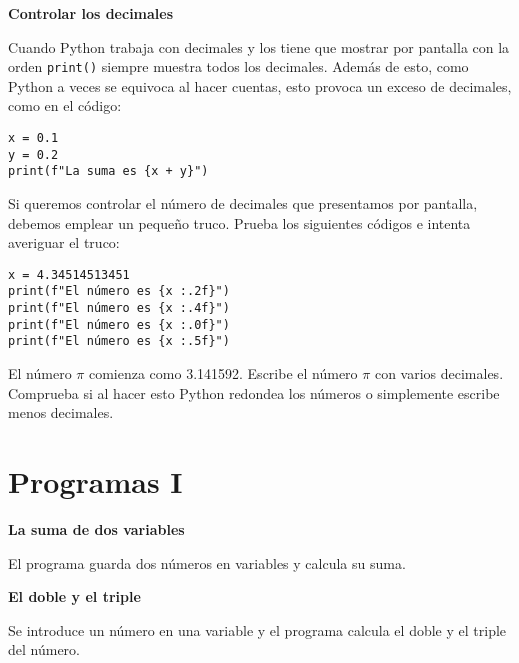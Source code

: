 \documentclass[a4paper, 11pt]{scrartcl}
\newenvironment{code}{\begin{tcolorbox}[colback=red!2!white]}{\end{tcolorbox}}
\begin{document}
\noindent\textbf{\sffamily \dag{} Controlar los decimales}

Cuando Python trabaja con decimales y los tiene que mostrar por pantalla con la orden \verb|print()| siempre muestra todos los decimales. Además de esto, como Python a veces se equivoca al hacer cuentas, esto provoca un exceso de decimales, como en el código:

\smallskip

\begin{code}

\begin{verbatim}
x = 0.1
y = 0.2
print(f"La suma es {x + y}")
\end{verbatim}

\end{code}

Si queremos controlar el número de decimales que presentamos por pantalla, debemos emplear un pequeño \guillemotleft truco\guillemotright. Prueba los siguientes códigos e intenta averiguar el \guillemotleft truco\guillemotright:

\smallskip

\begin{code}

\begin{verbatim}
x = 4.34514513451
print(f"El número es {x :.2f}")
print(f"El número es {x :.4f}")
print(f"El número es {x :.0f}")
print(f"El número es {x :.5f}")
\end{verbatim}

\end{code}

El número $\pi$ comienza como 3.141592. Escribe el número $\pi$ con varios decimales. Comprueba si al hacer esto Python redondea los números o simplemente escribe menos decimales.



\newpage

\section{Programas I}




\noindent\textbf{\sffamily La suma de dos variables}

El programa guarda dos números en variables y calcula su suma. 





\noindent\textbf{\sffamily El doble y el triple}

Se introduce un número en una variable  y el programa calcula el doble y el triple del número.
\end{document}
